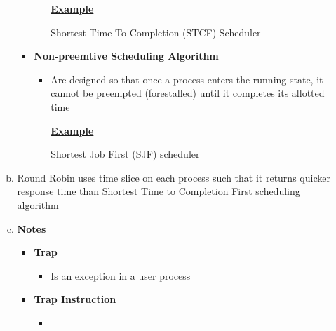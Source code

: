 \documentclass[12pt]{article}
\begin{document}
\begin{enumerate}[1.]
\begin{enumerate}[a)]
\begin{itemize}
\begin{itemize}
                \bigskip

                \underline{\textbf{Example}}

                \bigskip

                Shortest-Time-To-Completion (STCF) Scheduler

                \bigskip
            \end{itemize}
            \item \textbf{Non-preemtive Scheduling Algorithm}

            \begin{itemize}
                \item Are designed so that once a process enters the running state,
                it cannot be preempted (forestalled) until it completes its allotted time

                \bigskip

                \underline{\textbf{Example}}

                \bigskip

                Shortest Job First (SJF) scheduler
            \end{itemize}
        \end{itemize}

        \item

        Round Robin uses time slice on each process such that it returns
        quicker response time than Shortest Time to Completion First scheduling algorithm

        \item

        \bigskip

        \underline{\textbf{Notes}}

        \begin{itemize}
            \item \textbf{Trap}
            \begin{itemize}
                \item Is an exception in a user process
            \end{itemize}

            \item \textbf{Trap Instruction}

            \begin{itemize}
                \item
            \end{itemize}
        \end{itemize}

    \end{enumerate}





\end{enumerate}
\end{document}
